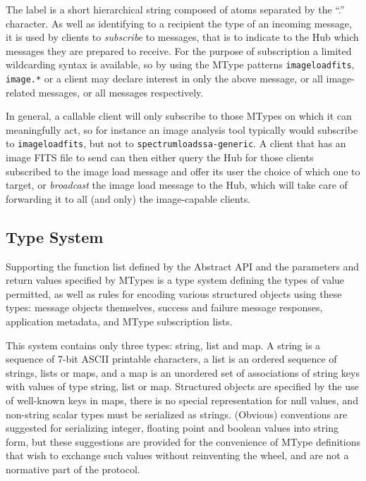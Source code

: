 \documentclass[5p]{elsarticle}
\begin{document}
The label is a short hierarchical string composed of atoms separated
by the ``.'' character.
As well as identifying to a recipient the type of an incoming message,
it is used by clients to {\em subscribe\/} to messages, that is to
indicate to the Hub which messages they are prepared to receive.
For the purpose of subscription a limited wildcarding syntax is available,
so by using the MType patterns
{\tt image{\kdot}load{\kdot}fits}, {\tt image.*} or {\tt *}
a client may declare interest in only the above message,
or all image-related messages, or all messages respectively.

In general, a callable client will only subscribe to those MTypes on which
it can meaningfully act, so for instance an image analysis tool
typically would subscribe to {\tt image{\kdot}load{\kdot}fits},
but not to {\tt spectrum{\kdot}load{\kdot}ssa-generic}.
A client that has an image FITS file to send can then
either query the Hub for those clients subscribed to the image load
message and offer its user the choice of which one to target,
or {\em broadcast} the image load message to the Hub, which will
take care of forwarding it to all (and only) the image-capable clients.

\subsection{Type System} \label{sec:typeSystem}

Supporting the function list defined by the Abstract API
and the parameters and return values specified by MTypes
is a type system defining the types of value permitted,
as well as rules for encoding various structured objects
using these types: message objects themselves, success and failure
message responses, application metadata, and MType subscription lists.

This system contains only three types:
string, list and map.
A string is a sequence of 7-bit ASCII printable characters,
a list is an ordered sequence of strings, lists or maps, and
a map is an unordered set of associations of string keys with values
of type string, list or map.
Structured objects are specified by the use of well-known keys in maps,
there is no special representation for null values,
and non-string scalar types must be serialized as strings.
(Obvious) conventions are suggested for serializing
integer, floating point and boolean values into string form,
but these suggestions are provided for the convenience
of MType definitions that wish to exchange such values without
reinventing the wheel, and are not a normative part of the protocol.
\end{document}
